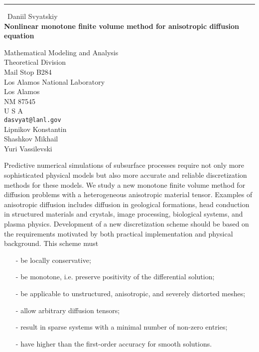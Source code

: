 \documentclass{report}
\begin{document}
\begin{center}
\rule{6in}{1pt} \
{\large Daniil Svyatskiy \\
{\bf Nonlinear monotone finite volume method for anisotropic diffusion equation}}

Mathematical Modeling and Analysis \\ Theoretical Division \\ Mail Stop B284 \\ Los Alamos National Laboratory \\ Los Alamos \\ NM 87545 \\ U S A
\\
{\tt dasvyat@lanl.gov}\\
Lipnikov Konstantin\\
Shashkov Mikhail\\
	Yuri Vassilevski\end{center}

Predictive numerical simulations of subsurface processes require
not only more sophisticated physical models but also more accurate
and reliable discretization methods for these models.
We study a new monotone finite volume method
for diffusion problems with a heterogeneous anisotropic material tensor. Examples of
anisotropic diffusion includes diffusion in geological formations,
head conduction in structured materials and crystals, image processing,
biological systems, and plasma physics.
Development of a new discretization scheme should be based on the
requirements motivated by both practical implementation and physical
background. This scheme must

\begin{itemize}
\item[-] be locally conservative;\\
\item[-] be monotone, i.e. preserve positivity of the differential solution;\\
\item[-] be applicable to unstructured, anisotropic, and severely distorted meshes; \\
\item[-] allow arbitrary diffusion tensors;\\
\item[-] result in sparse systems with a minimal number of non-zero entries;
\item[-] have higher than the first-order accuracy for smooth solutions.\\
\end{itemize}
\end{document}
